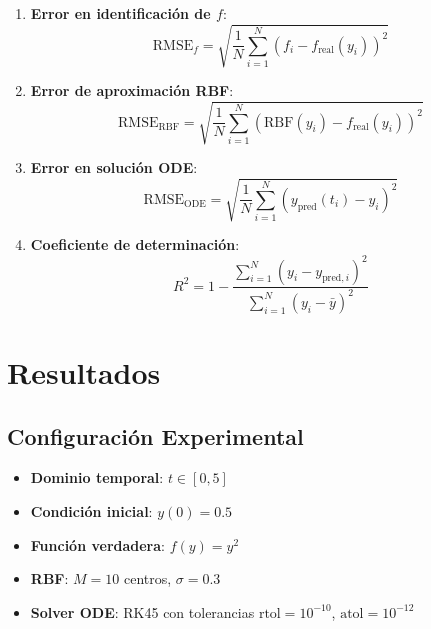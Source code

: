 \documentclass[11pt,a4paper]{article}
\begin{document}
\begin{enumerate}
    \item \textbf{Error en identificación de $f$}:
    \begin{equation}
    \text{RMSE}_f = \sqrt{\frac{1}{N}\sum_{i=1}^{N} (f_i - f_{\text{real}}(y_i))^2}
    \end{equation}

    \item \textbf{Error de aproximación RBF}:
    \begin{equation}
    \text{RMSE}_{\text{RBF}} = \sqrt{\frac{1}{N}\sum_{i=1}^{N} (\text{RBF}(y_i) - f_{\text{real}}(y_i))^2}
    \end{equation}

    \item \textbf{Error en solución ODE}:
    \begin{equation}
    \text{RMSE}_{\text{ODE}} = \sqrt{\frac{1}{N}\sum_{i=1}^{N} (y_{\text{pred}}(t_i) - y_i)^2}
    \end{equation}

    \item \textbf{Coeficiente de determinación}:
    \begin{equation}
    R^2 = 1 - \frac{\sum_{i=1}^{N}(y_i - y_{\text{pred},i})^2}{\sum_{i=1}^{N}(y_i - \bar{y})^2}
    \end{equation}
\end{enumerate}

\section{Resultados}

\subsection{Configuración Experimental}

\begin{itemize}
    \item \textbf{Dominio temporal}: $t \in [0, 5]$
    \item \textbf{Condición inicial}: $y(0) = 0.5$
    \item \textbf{Función verdadera}: $f(y) = y^2$
    \item \textbf{RBF}: $M = 10$ centros, $\sigma = 0.3$
    \item \textbf{Solver ODE}: RK45 con tolerancias $\text{rtol}=10^{-10}$, $\text{atol}=10^{-12}$
\end{itemize}
\end{document}
